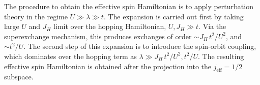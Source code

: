 The procedure to obtain the effective spin Hamiltonian is to apply perturbation theory %
in the regime $U \gg \lambda  \gg t$.
The expansion is carried out first by taking large $U$ and $J_H$ limit over the hopping Hamiltonian, $U, J_H \gg t$. Via the superexchange mechanism, this produces exchanges of order $\sim J_H \, t^2/U^2$, and $\sim t^2/U$. The second step of this expansion is to introduce the spin-orbit coupling, which dominates over the hopping term as $\lambda \gg J_H \, t^2/U^2, t^2/U$.   The resulting effective spin Hamiltonian is obtained after the projection into the $j_{\mathrm{eff}}=1/2$ subspace.










